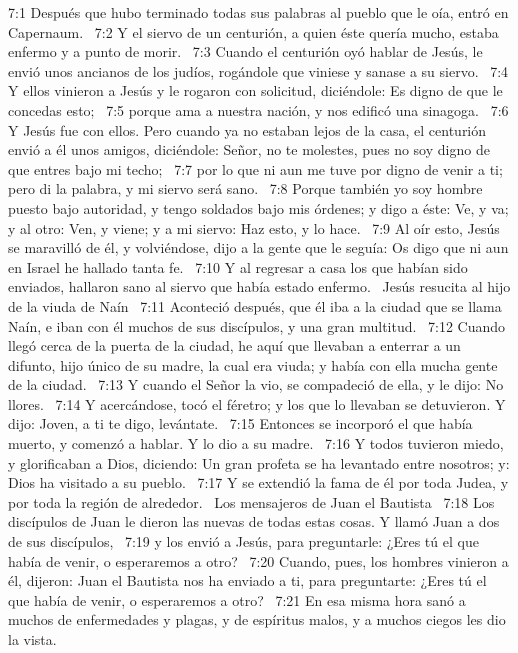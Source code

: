 7:1 Después que hubo terminado todas sus palabras al pueblo que le oía, entró en Capernaum.  
7:2 Y el siervo de un centurión, a quien éste quería mucho, estaba enfermo y a punto de morir.  
7:3 Cuando el centurión oyó hablar de Jesús, le envió unos ancianos de los judíos, rogándole que viniese y sanase a su siervo.  
7:4 Y ellos vinieron a Jesús y le rogaron con solicitud, diciéndole: Es digno de que le concedas esto;  
7:5 porque ama a nuestra nación, y nos edificó una sinagoga.  
7:6 Y Jesús fue con ellos. Pero cuando ya no estaban lejos de la casa, el centurión envió a él unos amigos, diciéndole: Señor, no te molestes, pues no soy digno de que entres bajo mi techo;  
7:7 por lo que ni aun me tuve por digno de venir a ti; pero di la palabra, y mi siervo será sano.  
7:8 Porque también yo soy hombre puesto bajo autoridad, y tengo soldados bajo mis órdenes; y digo a éste: Ve, y va; y al otro: Ven, y viene; y a mi siervo: Haz esto, y lo hace.  
7:9 Al oír esto, Jesús se maravilló de él, y volviéndose, dijo a la gente que le seguía: Os digo que ni aun en Israel he hallado tanta fe.  
7:10 Y al regresar a casa los que habían sido enviados, hallaron sano al siervo que había estado enfermo.  
Jesús resucita al hijo de la viuda de Naín  
7:11 Aconteció después, que él iba a la ciudad que se llama Naín, e iban con él muchos de sus discípulos, y una gran multitud.  
7:12 Cuando llegó cerca de la puerta de la ciudad, he aquí que llevaban a enterrar a un difunto, hijo único de su madre, la cual era viuda; y había con ella mucha gente de la ciudad.  
7:13 Y cuando el Señor la vio, se compadeció de ella, y le dijo: No llores.  
7:14 Y acercándose, tocó el féretro; y los que lo llevaban se detuvieron. Y dijo: Joven, a ti te digo, levántate.  
7:15 Entonces se incorporó el que había muerto, y comenzó a hablar. Y lo dio a su madre.  
7:16 Y todos tuvieron miedo, y glorificaban a Dios, diciendo: Un gran profeta se ha levantado entre nosotros; y: Dios ha visitado a su pueblo.  
7:17 Y se extendió la fama de él por toda Judea, y por toda la región de alrededor.  
Los mensajeros de Juan el Bautista   
7:18 Los discípulos de Juan le dieron las nuevas de todas estas cosas. Y llamó Juan a dos de sus discípulos,  
7:19 y los envió a Jesús, para preguntarle: ¿Eres tú el que había de venir, o esperaremos a otro?  
7:20 Cuando, pues, los hombres vinieron a él, dijeron: Juan el Bautista nos ha enviado a ti, para preguntarte: ¿Eres tú el que había de venir, o esperaremos a otro?  
7:21 En esa misma hora sanó a muchos de enfermedades y plagas, y de espíritus malos, y a muchos ciegos les dio la vista.  
